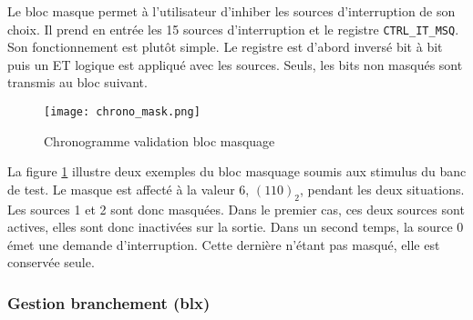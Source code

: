 Le bloc masque permet à l'utilisateur d'inhiber les sources d'interruption de son choix.
Il prend en entrée les 15 sources d'interruption et le registre \texttt{CTRL\_IT\_MSQ}.
Son fonctionnement est plutôt simple.
Le registre est d'abord inversé bit à bit puis un ET logique est appliqué avec les sources.
Seuls, les bits non masqués sont transmis au bloc suivant.
\begin{figure}[H]
    \centering
    \texttt{[image: chrono\_mask.png]}
    \caption{Chronogramme validation bloc masquage}
    \label{fig:chrono_mask}
\end{figure}
La figure \ref{fig:chrono_mask} illustre deux exemples du bloc masquage soumis aux stimulus du banc de test.
Le masque est affecté à la valeur 6, $(110)_2$, pendant les deux situations.
Les sources 1 et 2 sont donc  masquées.
Dans le premier cas, ces deux sources sont actives, elles sont donc inactivées sur la sortie.
Dans un second temps, la source 0 émet une demande d'interruption.
Cette dernière n'étant pas masqué, elle est conservée seule.



\subsubsection{Gestion branchement (blx)}

